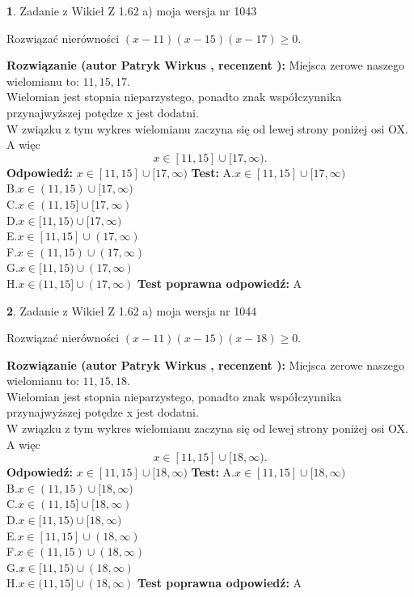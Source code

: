 \documentclass[12pt, a4paper]{article}
\theoremstyle{definition} %
\newtheorem{zad}{}
\newcommand{\zadStart}[1]{\begin{zad}#1\newline}
\newcommand{\zadStop}{\end{zad}}
\newcommand{\rozwStart}[2]{\noindent \textbf{Rozwiązanie (autor #1 , recenzent #2): }\newline}
\newcommand{\rozwStop}{\newline}
\newcommand{\odpStart}{\noindent \textbf{Odpowiedź:}\newline}
\newcommand{\odpStop}{\newline}
\newcommand{\testStart}{\noindent \textbf{Test:}\newline}
\newcommand{\testStop}{\newline}
\newcommand{\kluczStart}{\noindent \textbf{Test poprawna odpowiedź:}\newline}
\newcommand{\kluczStop}{\newline}
\begin{document}
\zadStart{Zadanie z Wikieł Z 1.62 a) moja wersja nr 1043}

Rozwiązać nierówności $(x-11)(x-15)(x-17)\ge0$.
\zadStop
\rozwStart{Patryk Wirkus}{}
Miejsca zerowe naszego wielomianu to: $11, 15, 17$.\\
Wielomian jest stopnia nieparzystego, ponadto znak współczynnika przy\linebreak najwyższej potędze x jest dodatni.\\ W związku z tym wykres wielomianu zaczyna się od lewej strony poniżej osi OX. A więc $$x \in [11,15] \cup [17,\infty).$$
\rozwStop
\odpStart
$x \in [11,15] \cup [17,\infty)$
\odpStop
\testStart
A.$x \in [11,15] \cup [17,\infty)$\\
B.$x \in (11,15) \cup [17,\infty)$\\
C.$x \in (11,15] \cup [17,\infty)$\\
D.$x \in [11,15) \cup [17,\infty)$\\
E.$x \in [11,15] \cup (17,\infty)$\\
F.$x \in (11,15) \cup (17,\infty)$\\
G.$x \in [11,15) \cup (17,\infty)$\\
H.$x \in (11,15] \cup (17,\infty)$
\testStop
\kluczStart
A
\kluczStop



\zadStart{Zadanie z Wikieł Z 1.62 a) moja wersja nr 1044}

Rozwiązać nierówności $(x-11)(x-15)(x-18)\ge0$.
\zadStop
\rozwStart{Patryk Wirkus}{}
Miejsca zerowe naszego wielomianu to: $11, 15, 18$.\\
Wielomian jest stopnia nieparzystego, ponadto znak współczynnika przy\linebreak najwyższej potędze x jest dodatni.\\ W związku z tym wykres wielomianu zaczyna się od lewej strony poniżej osi OX. A więc $$x \in [11,15] \cup [18,\infty).$$
\rozwStop
\odpStart
$x \in [11,15] \cup [18,\infty)$
\odpStop
\testStart
A.$x \in [11,15] \cup [18,\infty)$\\
B.$x \in (11,15) \cup [18,\infty)$\\
C.$x \in (11,15] \cup [18,\infty)$\\
D.$x \in [11,15) \cup [18,\infty)$\\
E.$x \in [11,15] \cup (18,\infty)$\\
F.$x \in (11,15) \cup (18,\infty)$\\
G.$x \in [11,15) \cup (18,\infty)$\\
H.$x \in (11,15] \cup (18,\infty)$
\testStop
\kluczStart
A
\kluczStop
\end{document}
